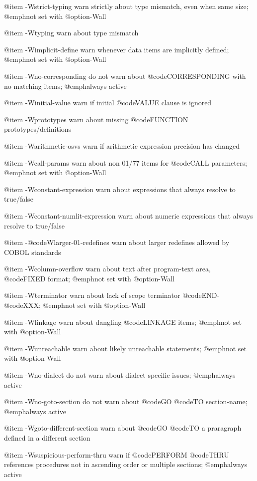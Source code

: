 @item -Wstrict-typing
warn strictly about type mismatch, even when same size; @emph{not} set with @option{-Wall}

@item -Wtyping
warn about type mismatch

@item -Wimplicit-define
warn whenever data items are implicitly defined; @emph{not} set with @option{-Wall}

@item -Wno-corresponding
do not warn about @code{CORRESPONDING} with no matching items; @emph{always} active

@item -Winitial-value
warn if initial @code{VALUE} clause is ignored

@item -Wprototypes
warn about missing @code{FUNCTION} prototypes/definitions

@item -Warithmetic-osvs
warn if arithmetic expression precision has changed

@item -Wcall-params
warn about non 01/77 items for @code{CALL} parameters; @emph{not} set with @option{-Wall}

@item -Wconstant-expression
warn about expressions that always resolve to true/false

@item -Wconstant-numlit-expression
warn about numeric expressions that always resolve to true/false

@item -@code{Wlarger-01}-redefines
warn about larger redefines allowed by COBOL standards

@item -Wcolumn-overflow
warn about text after program-text area, @code{FIXED} format; @emph{not} set with @option{-Wall}

@item -Wterminator
warn about lack of scope terminator @code{END}-@code{XXX}; @emph{not} set with @option{-Wall}

@item -Wlinkage
warn about dangling @code{LINKAGE} items; @emph{not} set with @option{-Wall}

@item -Wunreachable
warn about likely unreachable statements; @emph{not} set with @option{-Wall}

@item -Wno-dialect
do not warn about dialect specific issues; @emph{always} active

@item -Wno-goto-section
do not warn about @code{GO} @code{TO} section-name; @emph{always} active

@item -Wgoto-different-section
warn about @code{GO} @code{TO} a praragraph defined in a different section

@item -Wsuspicious-perform-thru
warn if @code{PERFORM} @code{THRU} references procedures not in ascending order or multiple sections; @emph{always} active

